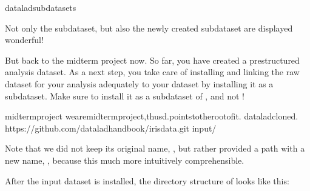 \begin{sphinxVerbatim}[commandchars=\\\{\}]
dataladsubdatasets
\end{sphinxVerbatim}

\sphinxAtStartPar
Not only the  subdataset, but also the newly created
 subdataset are displayed \textendash{} wonderful!

\sphinxAtStartPar
But back to the midterm project now. So far, you have created a pre\sphinxhyphen{}structured
analysis dataset. As a next step, you take care of installing and linking the
raw dataset for your analysis adequately to your  dataset
by installing it as a subdataset. Make sure to install it as a subdataset of
, and not !

\begin{sphinxVerbatim}[commandchars=\\\{\}]
midterm\PYGZus{}project
wearemidterm\PYGZus{}project,thus\PYGZhy{}d.pointstotherootofit.
dataladclone\PYGZhy{}d.
https://github.com/datalad\PYGZhy{}handbook/iris\PYGZus{}data.git
input/
\end{sphinxVerbatim}

\sphinxAtStartPar
Note that we did not keep its original name, , but rather provided
a path with a new name, , because this much more intuitively comprehensible.

\sphinxAtStartPar
After the input dataset is installed, the directory structure of 
looks like this:

